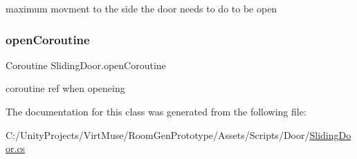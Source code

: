 maximum movment to the side the door needs to do to be open 

\mbox{\label{class_sliding_door_a0f440064aa6ae61923c4a05c38a6a60d}} 
\subsubsection{\texorpdfstring{open\+Coroutine}{openCoroutine}}
{\footnotesize\ttfamily Coroutine Sliding\+Door.\+open\+Coroutine\hspace{0.3cm}{\ttfamily [private]}}



coroutine ref when openeing 



The documentation for this class was generated from the following file\+:\begin{DoxyCompactItemize}
\item 
C\+:/\+Unity\+Projects/\+Virt\+Muse/\+Room\+Gen\+Prototype/\+Assets/\+Scripts/\+Door/\mbox{\hyperlink{_sliding_door_8cs}{Sliding\+Door.\+cs}}\end{DoxyCompactItemize}
